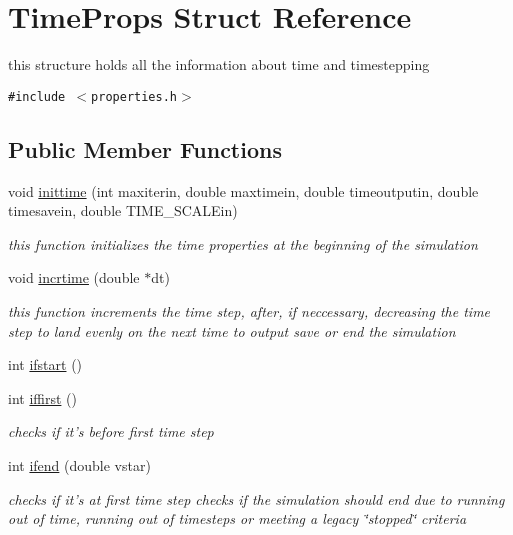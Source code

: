 \hypertarget{structTimeProps}{
\section{Time\-Props Struct Reference}
\label{structTimeProps}
}
this structure holds all the information about time and timestepping  


{\tt \#include $<$properties.h$>$}

\subsection*{Public Member Functions}
\begin{CompactItemize}
\item 
void \hyperlink{structTimeProps_a0}{inittime} (int maxiterin, double maxtimein, double timeoutputin, double timesavein, double TIME\_\-SCALEin)
\begin{CompactList}\small\item\em this function initializes the time properties at the beginning of the simulation \item\end{CompactList}\item 
void \hyperlink{structTimeProps_a1}{incrtime} (double $\ast$dt)
\begin{CompactList}\small\item\em this function increments the time step, after, if neccessary, decreasing the time step to land evenly on the next time to output save or end the simulation \item\end{CompactList}\item 
int \hyperlink{structTimeProps_a2}{ifstart} ()
\item 
int \hyperlink{structTimeProps_a3}{iffirst} ()
\begin{CompactList}\small\item\em checks if it's before first time step \item\end{CompactList}\item 
int \hyperlink{structTimeProps_a4}{ifend} (double vstar)
\begin{CompactList}\small\item\em checks if it's at first time step checks if the simulation should end due to running out of time, running out of timesteps or meeting a legacy \char`\"{}stopped\char`\"{} criteria \item\end{CompactList}\item 

\end{CompactItemize}
